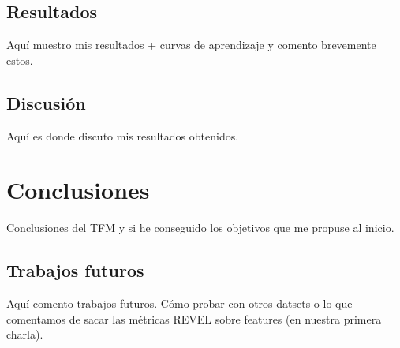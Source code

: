 \section{Resultados}

Aquí muestro mis resultados + curvas de aprendizaje y comento brevemente estos.

\section{Discusión} \label{sec:discusion}
Aquí es donde discuto mis resultados obtenidos.


\clearpage
\chapter{Conclusiones} \label{cap:conc}
Conclusiones del TFM y si he conseguido los objetivos que me propuse al inicio.

\section{Trabajos futuros}

Aquí comento trabajos futuros. Cómo probar con otros datsets o lo que comentamos de sacar las métricas REVEL sobre features (en nuestra primera charla).


